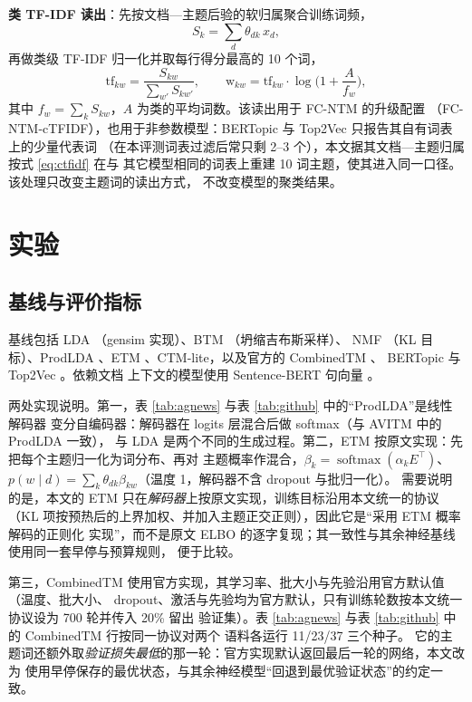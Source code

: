 \documentclass[11pt]{ctexart}
\newcommand{\fcntm}{FC-NTM}
\begin{document}
\textbf{类 TF-IDF 读出}：先按文档—主题后验的软归属聚合训练词频，
\begin{equation}
S_k=\sum_{d}\theta_{dk}\,x_d ,
\end{equation}
再做类级 TF-IDF 归一化并取每行得分最高的 10 个词，
\begin{equation}
\mathrm{tf}_{kw}=\frac{S_{kw}}{\sum_{w'}S_{kw'}},\qquad
\mathrm{w}_{kw}=\mathrm{tf}_{kw}\cdot\log\!\Big(1+\frac{A}{f_w}\Big),
\label{eq:ctfidf}
\end{equation}
其中 $f_w=\sum_k S_{kw}$，$A$ 为类的平均词数。该读出用于 \fcntm{} 的升级配置
（\fcntm{}-cTFIDF），也用于非参数模型：BERTopic 与 Top2Vec 只报告其自有词表上的少量代表词
（在本评测词表过滤后常只剩 2--3 个），本文据其文档—主题归属按式 \eqref{eq:ctfidf} 在与
其它模型相同的词表上重建 10 词主题，使其进入同一口径。该处理只改变主题词的读出方式，
不改变模型的聚类结果。

\section{实验}

\subsection{基线与评价指标}

基线包括 LDA \cite{blei2003lda}（gensim 实现）、BTM \cite{yan2013btm}（坍缩吉布斯采样）、
NMF \cite{lee2001nmf}（KL 目标）、ProdLDA \cite{srivastava2017avitm}、ETM
\cite{dieng2020etm}、CTM-lite，以及官方的 CombinedTM \cite{bianchi2021ctm}、
BERTopic \cite{grootendorst2022bertopic} 与 Top2Vec \cite{angelov2020top2vec}。依赖文档
上下文的模型使用 Sentence-BERT 句向量 \cite{reimers2019sbert}。

两处实现说明。第一，表 \ref{tab:agnews} 与表 \ref{tab:github} 中的“ProdLDA”是线性解码器
变分自编码器：解码器在 logits 层混合后做 softmax（与 AVITM 中的 ProdLDA 一致），
与 LDA 是两个不同的生成过程。第二，ETM 按原文实现：先把每个主题归一化为词分布、再对
主题概率作混合，$\beta_k=\operatorname{softmax}(\alpha_k E^{\top})$、
$p(w\mid d)=\sum_k\theta_{dk}\beta_{kw}$（温度 1，解码器不含 dropout 与批归一化）。
需要说明的是，本文的 ETM 只在\emph{解码器}上按原文实现，训练目标沿用本文统一的协议
（KL 项按预热后的上界加权、并加入主题正交正则），因此它是“采用 ETM 概率解码的正则化
实现”，而不是原文 ELBO 的逐字复现；其一致性与其余神经基线使用同一套早停与预算规则，
便于比较。

第三，CombinedTM 使用官方实现，其学习率、批大小与先验沿用官方默认值（温度、批大小、
dropout、激活与先验均为官方默认，只有训练轮数按本文统一协议设为 700 轮并传入 20\% 留出
验证集）。表 \ref{tab:agnews} 与表 \ref{tab:github} 中的 CombinedTM 行按同一协议对两个
语料各运行 11/23/37 三个种子。
它的主题词还额外取\emph{验证损失最低}的那一轮：官方实现默认返回最后一轮的网络，本文改为
使用早停保存的最优状态，与其余神经模型“回退到最优验证状态”的约定一致。
\end{document}
